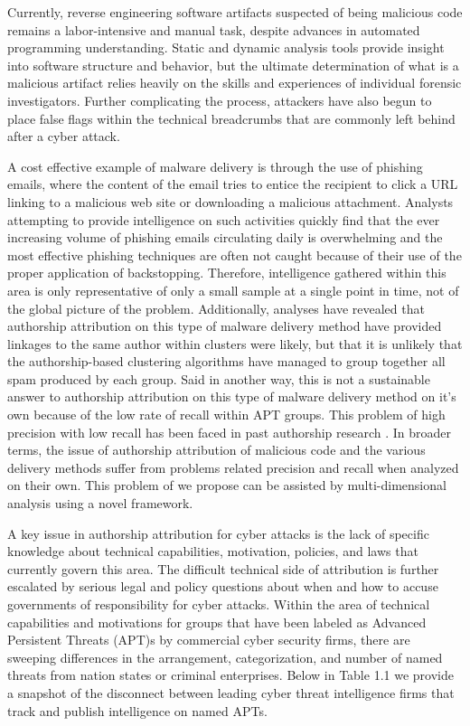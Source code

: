 \documentclass[12pt]{report}
\begin{document}
Currently, reverse engineering software artifacts suspected of being malicious code remains a labor-intensive and manual task, despite advances in automated programming understanding.  Static and dynamic analysis tools provide insight into software structure and behavior, but the ultimate determination of what is a malicious artifact relies heavily on the skills and experiences of individual forensic investigators.  Further complicating the process, attackers have also begun to place false flags within the technical breadcrumbs that are commonly left behind after a cyber attack.  

A cost effective example of malware delivery is through the use of phishing emails, where the content of the email tries to entice the recipient to click a URL linking to a malicious web site or downloading a malicious attachment. Analysts attempting to provide intelligence on such activities quickly find that the ever increasing volume of phishing emails circulating daily is overwhelming and the most effective phishing techniques are often not caught because of their use of the proper application of backstopping.  Therefore, intelligence gathered within this area is only representative of only a small sample at a single point in time, not of the global picture of the problem.  Additionally, analyses have revealed that authorship attribution on this type of malware delivery method have provided linkages to the same author within clusters were likely, but that it is unlikely that the authorship-based clustering algorithms have managed to group together all spam produced by each group.  Said in another way, this is not a sustainable answer to authorship attribution on this type of malware delivery method on it's own because of the low rate of recall within APT groups.  This problem of high precision with low recall has been faced in past authorship research \cite{li2017association}.  In broader terms, the issue of authorship attribution of malicious code and the various delivery methods suffer from problems related precision and recall when analyzed on their own.  This problem of we propose can be assisted by multi-dimensional analysis using a novel framework.

A key issue in authorship attribution for cyber attacks is the lack of specific knowledge about technical capabilities, motivation, policies, and laws that currently govern this area.  The difficult technical side of attribution is further escalated by serious legal and policy questions about when and how to accuse governments of responsibility for cyber attacks.  Within the area of technical capabilities and motivations for groups that have been labeled as Advanced Persistent Threats (APT)s by commercial cyber security firms, there are sweeping differences in the arrangement, categorization, and number of named threats from nation states or criminal enterprises. \cite{romanosky2019private}  Below in Table 1.1 we provide a snapshot of the disconnect between leading cyber threat intelligence firms that track and publish intelligence on named APTs.
\end{document}
